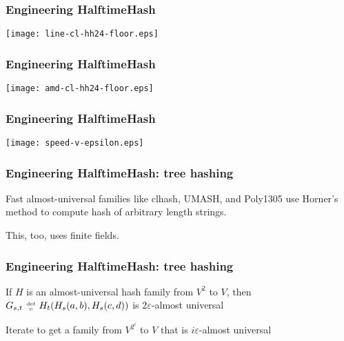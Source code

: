 \documentclass[xcolor=dvipsnames,hyperref={hidelinks}]{beamer}
\newcommand{\defeq}{\;\genfrac{}{}{0pt}{2}{\text{def}}{=}\;}
\begin{document}
\begin{frame}
  \frametitle{Engineering HalftimeHash}
  \begin{center}
    \texttt{[image: line-cl-hh24-floor.eps]}
  \end{center}
\end{frame}

\begin{frame}
  \frametitle{Engineering HalftimeHash}
  \begin{center}
    \texttt{[image: amd-cl-hh24-floor.eps]}
  \end{center}
\end{frame}

\begin{frame}
  \frametitle{Engineering HalftimeHash}
  \begin{center}
    \texttt{[image: speed-v-epsilon.eps]}
  \end{center}
\end{frame}


\begin{frame}
  \frametitle{Engineering HalftimeHash: tree hashing}
  Fast almost-universal families like clhash, UMASH, and Poly1305 use Horner's method to compute hash of arbitrary length strings.
  \pause

  $ $\\
  This, too, uses finite fields.
\end{frame}

\begin{frame}
  \frametitle{Engineering HalftimeHash: tree hashing}
  If $H$ is an almost-universal hash family from $V^2$ to $V$, then
  $G_{s,t} \defeq H_t(H_s(a, b), H_s(c,d))$ is $2 \varepsilon$-almost universal
  \pause
  
  $ $\\
  Iterate to get a family from  $V^{2^i}$ to $V$ that is $i \varepsilon$-almost universal
\end{frame}

\end{document}
